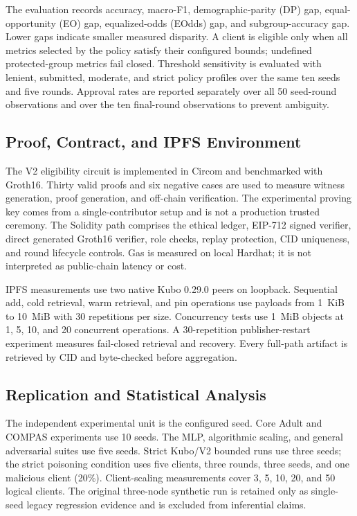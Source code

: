 \documentclass[futureinternet,article,submit,pdftex,moreauthors]{Definitions/mdpi}
\begin{document}
The evaluation records accuracy, macro-F1, demographic-parity (DP) gap, equal-opportunity (EO) gap, equalized-odds (EOdds) gap, and subgroup-accuracy gap. Lower gaps indicate smaller measured disparity. A client is eligible only when all metrics selected by the policy satisfy their configured bounds; undefined protected-group metrics fail closed. Threshold sensitivity is evaluated with lenient, submitted, moderate, and strict policy profiles over the same ten seeds and five rounds. Approval rates are reported separately over all 50 seed-round observations and over the ten final-round observations to prevent ambiguity.

\subsection{Proof, Contract, and IPFS Environment}

The V2 eligibility circuit is implemented in Circom and benchmarked with Groth16. Thirty valid proofs and six negative cases are used to measure witness generation, proof generation, and off-chain verification. The experimental proving key comes from a single-contributor setup and is not a production trusted ceremony. The Solidity path comprises the ethical ledger, EIP-712 signed verifier, direct generated Groth16 verifier, role checks, replay protection, CID uniqueness, and round lifecycle controls. Gas is measured on local Hardhat; it is not interpreted as public-chain latency or cost.

IPFS measurements use two native Kubo 0.29.0 peers on loopback. Sequential add, cold retrieval, warm retrieval, and pin operations use payloads from 1~KiB to 10~MiB with 30 repetitions per size. Concurrency tests use 1~MiB objects at 1, 5, 10, and 20 concurrent operations. A 30-repetition publisher-restart experiment measures fail-closed retrieval and recovery. Every full-path artifact is retrieved by CID and byte-checked before aggregation.

\subsection{Replication and Statistical Analysis}

The independent experimental unit is the configured seed. Core Adult and COMPAS experiments use 10 seeds. The MLP, algorithmic scaling, and general adversarial suites use five seeds. Strict Kubo/V2 bounded runs use three seeds; the strict poisoning condition uses five clients, three rounds, three seeds, and one malicious client (20\%). Client-scaling measurements cover 3, 5, 10, 20, and 50 logical clients. The original three-node synthetic run is retained only as single-seed legacy regression evidence and is excluded from inferential claims.
\end{document}
